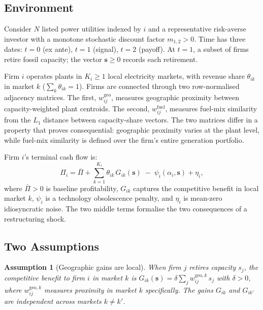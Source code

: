 \documentclass[12pt,a4paper]{article}
\newtheorem{assumption}{Assumption}
\begin{document}
\subsection{Environment}\label{sec:environment}

Consider $N$ listed power utilities indexed by $i$ and a representative risk-averse investor with a monotone stochastic discount factor $m_{1,2} > 0$. Time has three dates: $t=0$ (ex ante), $t=1$ (signal), $t=2$ (payoff). At $t=1$, a subset of firms retire fossil capacity; the vector $\mathbf{s} \geq 0$ records each retirement.

Firm $i$ operates plants in $K_i \geq 1$ local electricity markets, with revenue share $\theta_{ik}$ in market $k$ ($\sum_k \theta_{ik} = 1$). Firms are connected through two row-normalised adjacency matrices. The first, $w^{\text{geo}}_{ij}$, measures geographic proximity between capacity-weighted plant centroids. The second, $w^{\text{fuel}}_{ij}$, measures fuel-mix similarity from the $L_1$ distance between capacity-share vectors. The two matrices differ in a property that proves consequential: geographic proximity varies at the plant level, while fuel-mix similarity is defined over the firm's entire generation portfolio.

Firm $i$'s terminal cash flow is:
\begin{equation}\label{eq:cashflows}
    \Pi_i = \bar{\Pi} + \sum_{k=1}^{K_i} \theta_{ik}\, G_{ik}(\mathbf{s}) \;-\; \psi_i(\alpha_i, \mathbf{s}) + \eta_i,
\end{equation}
where $\bar{\Pi} > 0$ is baseline profitability, $G_{ik}$ captures the competitive benefit in local market $k$, $\psi_i$ is a technology obsolescence penalty, and $\eta_i$ is mean-zero idiosyncratic noise. The two middle terms formalise the two consequences of a restructuring shock.

\subsection{Two Assumptions}\label{sec:channels}

\begin{assumption}[Geographic gains are local]\label{ass:competition}
    When firm $j$ retires capacity $s_j$, the competitive benefit to firm $i$ in market $k$ is $G_{ik}(\mathbf{s}) = \delta \sum_j w^{\mathrm{geo},k}_{ij}\, s_j$ with $\delta > 0$, where $w^{\mathrm{geo},k}_{ij}$ measures proximity in market $k$ specifically. The gains $G_{ik}$ and $G_{ik'}$ are independent across markets $k \neq k'$.
\end{assumption}
\end{document}
